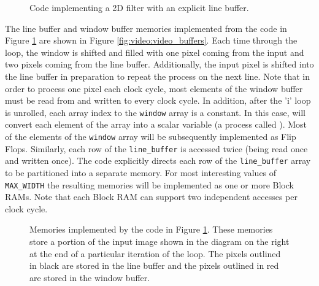 \begin{figure}
{\tiny }
\caption{Code implementing a 2D filter with an explicit line buffer.}\label{fig:video:2Dfilter_linebuffer}
\end{figure}

The line buffer and window buffer memories implemented from the code in Figure \ref{fig:video:2Dfilter_linebuffer} are shown in Figure \ref{fig:video:video_buffers}.    Each time through the loop, the window is shifted and filled with one pixel coming from the input and two pixels coming from the line buffer.  Additionally, the input pixel is shifted into the line buffer in preparation to repeat the process on the next line.  Note that in order to process one pixel each clock cycle, most elements of the window buffer must be read from and written to every clock cycle. In addition, after the 'i' loop is unrolled, each array index to the \lstinline|window| array is a constant.  In this case, \VHLS will convert each element of the array into a scalar variable (a process called ).  Most of the elements of the \lstinline|window| array will be subsequently implemented as Flip Flops.  Similarly, each row of the \lstinline|line_buffer| is accessed twice (being read once and written once).  The code explicitly directs each row of the \lstinline|line_buffer| array to be partitioned into a separate memory.  For most interesting values of \lstinline|MAX_WIDTH| the resulting memories will be implemented as one or more Block RAMs.  Note that each Block RAM can support two independent accesses per clock cycle.

\begin{figure}
\centering
{\tiny }
\caption{ Memories implemented by the code in Figure \ref{fig:video:2Dfilter_linebuffer}.  These memories store a portion of the input image shown in the diagram on the right at the end of a particular iteration of the loop.  The pixels outlined in black are stored in the line buffer and the pixels outlined in red are stored in the window buffer.}\label{fig:video:video_buffers}
\label{fig:dft-visualization}
\end{figure}


